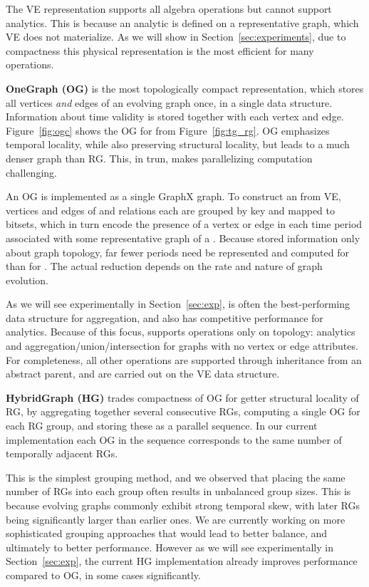 The VE representation supports all \tg algebra operations but cannot
support analytics.  This is because an analytic is defined on a
representative graph, which VE does not materialize.  As we will show
in Section~\ref{sec:experiments}, due to compactness this physical
representation is the most efficient for many operations.

{\bf OneGraph (OG)} is the most topologically compact representation,
which stores all vertices {\em and} edges of an evolving graph once,
in a single data structure.  Information about time validity is stored
together with each vertex and edge.  Figure~\ref{fig:ogc} shows the OG
for \tg {} from Figure~\ref{fig:tg_rg}.  OG emphasizes
temporal locality, while also preserving structural locality, but
leads to a much denser graph than RG.  This, in trun, makes
parallelizing computation challenging.

An OG is implemented as a single GraphX graph.  To construct an \og
from VE, vertices and edges of \tv and \te relations each are grouped
by key and mapped to bitsets, which in turn encode the presence of a
vertex or edge in each time period associated with some representative
graph of a \tg.  Because \og stored information only about graph
topology, far fewer periods need be represented and computed for \og
than for \rg.  The actual reduction depends on the rate and nature of
graph evolution.

As we will see experimentally in Section~\ref{sec:exp}, \og is often
the best-performing data structure for aggregation, and also has
competitive performance for analytics.  Because of this focus, \og
supports operations only on topology: analytics and
aggregation/union/intersection for graphs with no vertex or edge
attributes.  For completeness, all other operations are supported
through inheritance from an abstract parent, and are carried out on
the VE data structure.

{\bf HybridGraph (HG)} trades compactness of OG for getter structural
locality of RG, by aggregating together several consecutive RGs,
computing a single OG for each RG group, and storing these as a
parallel sequence.  In our current implementation each OG in the
sequence corresponds to the same number of temporally adjacent RGs.

This is the simplest grouping method, and we observed that placing the
same number of RGs into each group often results in unbalanced group
sizes.  This is because evolving graphs commonly exhibit strong
temporal skew, with later RGs being significantly larger than earlier
ones.  We are currently working on more sophisticated grouping
approaches that would lead to better balance, and ultimately to better
performance.  However as we will see experimentally in
Section~\ref{sec:exp}, the current HG implementation already improves
performance compared to OG, in some cases significantly.

